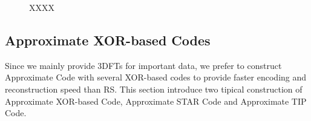 \documentclass[sigconf]{acmart}
\begin{document}
\begin{figure}
    \centering
    \caption{XXXX}
\end{figure}

\subsection{Approximate XOR-based Codes}
Since we mainly provide 3DFTs for important data, we prefer to construct Approximate Code with several XOR-based codes to provide faster encoding and reconstruction speed than RS. This section introduce two tipical construction of Approximate XOR-based Code, Approximate STAR Code and Approximate TIP Code.
\end{document}
